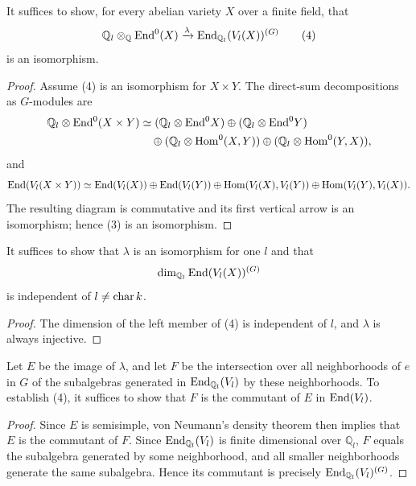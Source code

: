 \begin{proposition}[Step II]
\label{mumford-appI-step-II}
It suffices to show, for every abelian variety $X$ over a finite field, that
\[
 \mathbb Q_l\otimes_{\mathbb Q}{\rm End}^{0}(X)
 \xrightarrow{\lambda}{\rm End}_{\mathbb Q_l}(V_l(X))^{(G)} \tag{4}
\]
is an isomorphism.
\end{proposition}
\begin{proof}
Assume (4) is an isomorphism for $X\times Y$. The direct-sum decompositions
as $G$-modules are
\[
\begin{aligned}
 \mathbb Q_l\otimes {\rm End}^{0}(X\times Y)&\simeq
 (\mathbb Q_l\otimes {\rm End}^{0}X)\oplus(\mathbb Q_l\otimes {\rm End}^{0}Y)\\
 &\quad\oplus(\mathbb Q_l\otimes {\rm Hom}^{0}(X,Y))\oplus
 (\mathbb Q_l\otimes {\rm Hom}^{0}(Y,X)),
\end{aligned}
\]
and
\[
 {\rm End}(V_l(X\times Y))\simeq {\rm End}(V_l(X))\oplus {\rm End}(V_l(Y))
 \oplus {\rm Hom}(V_l(X),V_l(Y))\oplus {\rm Hom}(V_l(Y),V_l(X)).
\]
The resulting diagram is commutative and its first vertical arrow is an
isomorphism; hence (3) is an isomorphism.

\end{proof}


\begin{proposition}
\label{mumford-appI-step-III}
It suffices to show that $\lambda$ is an isomorphism for one $l$ and that
\[\dim_{\mathbb Q_l}{\rm End}(V_l(X))^{(G)}\]
is independent of $l\ne {\rm char}\,k$.
\end{proposition}
\begin{proof}
The dimension of the left member of (4) is independent of $l$, and $\lambda$
is always injective.

\end{proof}


\begin{proposition}[Step IV]
\label{mumford-appI-step-IV}
Let $E$ be the image of $\lambda$, and let $F$ be the intersection over all
neighborhoods of $e$ in $G$ of the subalgebras generated in
${\rm End}_{\mathbb Q_l}(V_l)$ by these neighborhoods. To establish (4), it
suffices to show that $F$ is the commutant of $E$ in ${\rm End}(V_l)$.
\end{proposition}
\begin{proof}
Since $E$ is semisimple, von Neumann's density theorem then implies that $E$
is the commutant of $F$. Since ${\rm End}_{\mathbb Q_l}(V_l)$ is finite
dimensional over $\mathbb Q_l$, $F$ equals the subalgebra generated by some
neighborhood, and all smaller neighborhoods generate the same subalgebra.
Hence its commutant is precisely ${\rm End}_{\mathbb Q_l}(V_l)^{(G)}$.

\end{proof}


